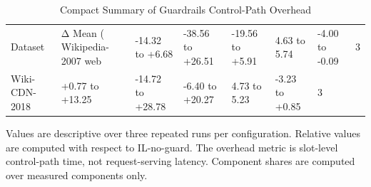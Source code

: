 \begin{table}[t]
\centering
\footnotesize
\caption{Compact Summary of Guardrails Control-Path Overhead}
\label{tab:v3_guardrails_overhead_compact}
\begin{tabular}{lllllll}
\toprule
Dataset & Δ Mean (%
\midrule
Wikipedia-2007 web & -14.32 to +6.68 & -38.56 to +26.51 & -19.56 to +5.91 & 4.63 to 5.74 & -4.00 to -0.09 & 3 \\
Wiki-CDN-2018 & +0.77 to +13.25 & -14.72 to +28.78 & -6.40 to +20.27 & 4.73 to 5.23 & -3.23 to +0.85 & 3 \\
\bottomrule
\end{tabular}
\vspace{0.4ex}\par\scriptsize{Values are descriptive over three repeated runs per configuration. Relative values are computed with respect to IL-no-guard. The overhead metric is slot-level control-path time, not request-serving latency. Component shares are computed over measured components only.}
\end{table}
